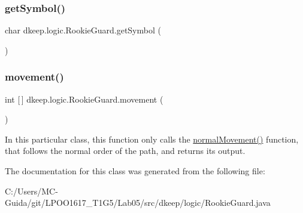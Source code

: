 \subsubsection{\texorpdfstring{get\+Symbol()}{getSymbol()}}
{\footnotesize\ttfamily char dkeep.\+logic.\+Rookie\+Guard.\+get\+Symbol (\begin{DoxyParamCaption}{ }\end{DoxyParamCaption})}

\mbox{\label{classdkeep_1_1logic_1_1_rookie_guard_ae78bec3a34dbd5cbac6a90af92fd7984}} 
\subsubsection{\texorpdfstring{movement()}{movement()}}
{\footnotesize\ttfamily int \mbox{[}$\,$\mbox{]} dkeep.\+logic.\+Rookie\+Guard.\+movement (\begin{DoxyParamCaption}{ }\end{DoxyParamCaption})}

In this particular class, this function only calls the \hyperlink{classdkeep_1_1logic_1_1_guard_a2389016085c6d65d4366930fac72dab4}{normal\+Movement()} function, that follows the normal order of the path, and returns its output. 

The documentation for this class was generated from the following file\+:\begin{DoxyCompactItemize}
\item 
C\+:/\+Users/\+M\+C-\/\+Guida/git/\+L\+P\+O\+O1617\+\_\+\+T1\+G5/\+Lab05/src/dkeep/logic/Rookie\+Guard.\+java\end{DoxyCompactItemize}
